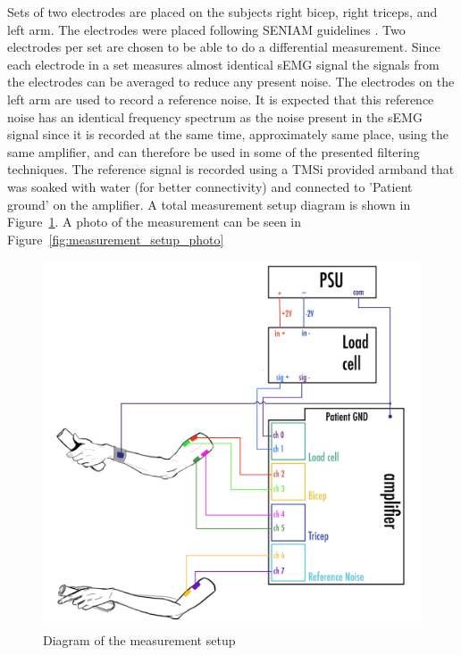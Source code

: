 Sets of two electrodes are placed on the subjects right bicep, right triceps, and left arm. The electrodes were placed following SENIAM guidelines \cite{seniam}. Two electrodes per set are chosen to be able to do a differential measurement. Since each electrode in a set measures almost identical sEMG signal the signals from the electrodes can be averaged to reduce any present noise. The electrodes on the left arm are used to record a reference noise. It is expected that this reference noise has an identical frequency spectrum as the noise present in the sEMG signal since it is recorded at the same time, approximately same place, using the same amplifier, and can therefore be used in some of the presented filtering techniques. The reference signal is recorded using a TMSi provided armband that was soaked with water (for better connectivity) and connected to 'Patient ground' on the amplifier. A total measurement setup diagram is shown in Figure~\ref{fig:measurement_setup_diagram}. A photo of the measurement can be seen in Figure~\ref{fig:measurement_setup_photo}

\begin{figure}[h!t]
	\begin{center}
		\includegraphics[width=1.0\columnwidth]{images/measurement_setup_diagram.png}
	\end{center}
	\caption{Diagram of the measurement setup}
	\label{fig:measurement_setup_diagram}
\end{figure}

